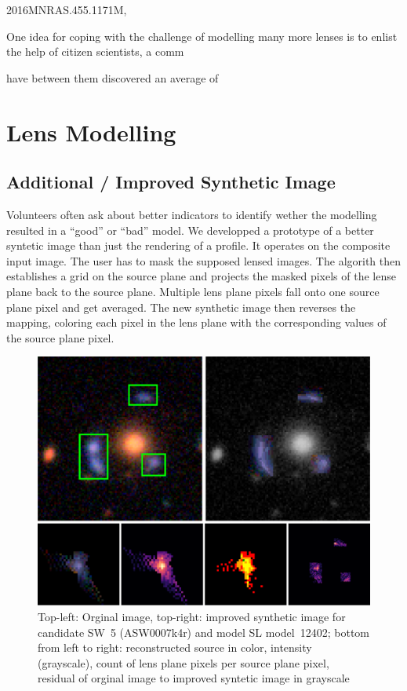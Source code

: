\documentclass[fleqn,usenatbib]{mnras}
\newcommand{\asw}[1]{ASW000#1}
\newcommand{\sw}[1]{SW~#1}
\newcommand{\model}[1]{SL model~#1}
\begin{document}
2016MNRAS.455.1171M,


One idea for coping with the challenge of modelling many more lenses
is to enlist the help of citizen scientists, a comm



 have between them discovered an average of








\section{Lens Modelling}


\subsection{Additional / Improved Synthetic Image}

Volunteers often ask about better indicators to identify wether the modelling resulted in a ``good'' or ``bad'' model.
We developped a prototype of a better syntetic image than just the rendering of a  profile.
It operates on the composite input image.
The user has to mask the supposed lensed images.
The algorith then establishes a grid on the source plane and projects the masked pixels of the lense plane back to the source plane.
Multiple lens plane pixels fall onto one source plane pixel and get averaged.
The new synthetic image then reverses the mapping, coloring each pixel in the lens plane with the corresponding values of the source plane pixel.

\begin{figure}
  \includegraphics[width=\linewidth]{img/new_synth_img_detailed}
  \caption{
      Top-left: Orginal image, top-right: improved synthetic image for candidate \sw{5} (\asw{7k4r}) and model \model{12402};
      bottom from left to right:
        reconstructed source in color,
        intensity (grayscale),
        count of lens plane pixels per source plane pixel,
        residual of orginal image to improved syntetic image in grayscale
    }
  \label{fig:synthimg}
\end{figure}
\end{document}
